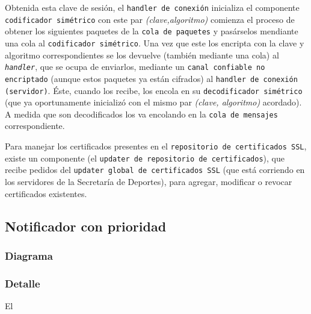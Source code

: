 Obtenida esta clave de sesión, el \texttt{handler de conexión} inicializa el componente \texttt{codificador simétrico} con este par \emph{(clave,algoritmo)} comienza el proceso de obtener los siguientes paquetes de la \texttt{cola de paquetes} y pasárselos mendiante una cola al \texttt{codificador simétrico}. Una vez que este los encripta con la clave y algoritmo correspondientes se los devuelve (también mediante una cola) al \texttt{\emph{handler}}, que se ocupa de enviarlos, mediante un \texttt{canal confiable no encriptado} (aunque estos paquetes ya están cifrados) al \texttt{handler de conexión (servidor)}. Éste, cuando los recibe, los encola en su \texttt{decodificador simétrico} (que ya oportunamente inicializó con el mismo par \emph{(clave, algoritmo)} acordado). A medida que son decodificados los va encolando en la \texttt{cola de mensajes} correspondiente.


Para manejar los certificados presentes en el \texttt{repositorio de certificados SSL}, existe un componente (el \texttt{updater de repositorio de certificados}), que recibe pedidos del \texttt{updater global de certificados SSL} (que está corriendo en los servidores de la Secretaría de Deportes), para agregar, modificar o revocar certificados existentes. 

\subsection{Notificador con prioridad}
\subsubsection{Diagrama}

\subsubsection{Detalle}
El 